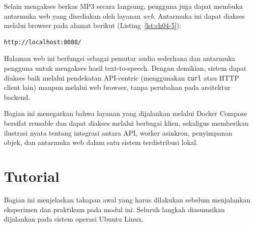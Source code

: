 Selain mengakses berkas MP3 secara langsung, pengguna juga dapat membuka
antarmuka web yang disediakan oleh layanan \textit{web}. Antarmuka ini dapat
diakses melalui browser pada alamat berikut (Listing~\ref{lst:ch04-5}):

\begin{lstlisting}[language=bash, caption={Potongan kode pada Menjalankan Contoh}, label={lst:ch04-5}]
http://localhost:8088/
\end{lstlisting}

Halaman web ini berfungsi sebagai pemutar audio sederhana dan antarmuka
pengguna untuk mengakses hasil text-to-speech. Dengan demikian, sistem dapat
diakses baik melalui pendekatan API-centric (menggunakan \texttt{curl} atau
HTTP client lain) maupun melalui web browser, tanpa perubahan pada arsitektur
backend.

Bagian ini menegaskan bahwa layanan yang dijalankan melalui Docker Compose
bersifat reusable dan dapat diakses melalui berbagai klien, sekaligus
memberikan ilustrasi nyata tentang integrasi antara API, worker asinkron,
penyimpanan objek, dan antarmuka web dalam satu sistem terdistribusi lokal.


\section{Tutorial}

Bagian ini menjelaskan tahapan awal yang harus dilakukan sebelum menjalankan
eksperimen dan praktikum pada modul ini. Seluruh langkah diasumsikan
dijalankan pada sistem operasi Ubuntu Linux.


